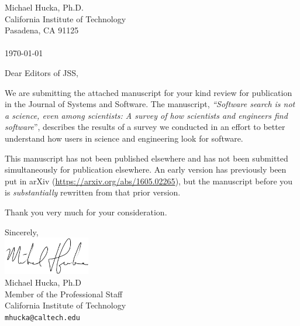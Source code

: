 \documentclass[11pt]{mhletter}
\begin{document}
\thispagestyle{empty}



\hspace{4in}%
\begin{flushright}
\begin{minipage}{3in}
Michael Hucka, Ph.D.\\
California Institute of Technology\\
Pasadena, CA 91125\\
\\
\today
\end{minipage}
\end{flushright}

\vspace*{2ex}

\begin{flushleft}

\end{flushleft}

\setlength{\parskip}{0.7em}

Dear Editors of JSS,

We are submitting the attached manuscript for your kind review for publication in the Journal of Systems and Software.  The manuscript, \emph{``Software search is not a science, even among scientists: A survey of how scientists and engineers find software}'', describes the results of a survey we conducted in an effort to better understand how users in science and engineering look for software.

This manuscript has not been published elsewhere and has not been submitted simultaneously for publication elsewhere.  An early version has previously been put in arXiv (\url{https://arxiv.org/abs/1605.02265}), but the manuscript before you is \emph{substantially} rewritten from that prior version.

Thank you very much for your consideration.

Sincerely,\\
\includegraphics[height = 0.65in]{sig-mh.pdf}\\
Michael Hucka, Ph.D\\
Member of the Professional Staff\\
California Institute of Technology\\[5pt]
\texttt{mhucka@caltech.edu}
\end{document}
